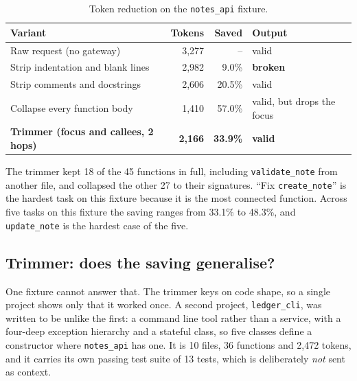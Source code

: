 \documentclass[12pt, a4paper, oneside]{report}
\newcommand{\code}[1]{\texttt{#1}}
\begin{document}
\begin{table}[H]
\centering
\begin{tabular}{lrrl}
\toprule
Variant & Tokens & Saved & Output \\
\midrule
Raw request (no gateway)                         & 3,277 & --      & valid \\
Strip indentation and blank lines                & 2,982 & 9.0\%  & \textbf{broken} \\
Strip comments and docstrings                    & 2,606 & 20.5\% & valid \\
Collapse every function body                     & 1,410 & 57.0\% & valid, but drops the focus \\
\textbf{Trimmer (focus and callees, 2 hops)}     & \textbf{2,166} & \textbf{33.9\%} & \textbf{valid} \\
\bottomrule
\end{tabular}
\caption{Token reduction on the \code{notes\_api} fixture.}
\label{tab:trimmer}
\end{table}

The trimmer kept 18 of the 45 functions in full, including \code{validate\_note}
from another file, and collapsed the other 27 to their signatures. ``Fix
\code{create\_note}'' is the hardest task on this fixture because it is the most
connected function. Across five tasks on this fixture the saving ranges from
33.1\% to 48.3\%, and \code{update\_note} is the hardest case of the five.

\subsection{Trimmer: does the saving generalise?}

One fixture cannot answer that. The trimmer keys on code shape, so a single
project shows only that it worked once. A second project, \code{ledger\_cli},
was written to be unlike the first: a command line tool rather than a service,
with a four-deep exception hierarchy and a stateful class, so five classes
define a constructor where \code{notes\_api} has one. It is 10 files, 36
functions and 2,472 tokens, and it carries its own passing test suite of 13
tests, which is deliberately \emph{not} sent as context.
\end{document}
